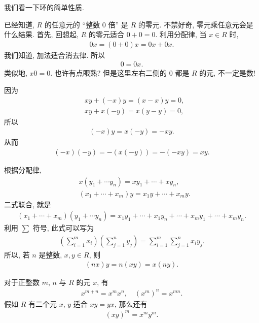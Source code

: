\begin{remark}
    我们看一下环的简单性质.

    已经知道, $R$ 的任意元的 ``整数 $0$ 倍'' 是 $R$ 的零元. 不禁好奇, 零元乘任意元会是什么结果. 首先, 回想起, $R$ 的零元适合 $0+0=0$. 利用分配律, 当 $x \in R$ 时,
    \begin{align*}
        0x = (0+0)x = 0x + 0x.
    \end{align*}
    我们知道, 加法适合消去律. 所以
    \begin{align*}
        0 = 0x.
    \end{align*}
    类似地, $x0 = 0$. 也许有点眼熟? 但是这里左右二侧的 $0$ 都是 $R$ 的元, 不一定是数!

    因为
    \begin{align*}
         & xy + (-x)y = (x-x)y = 0, \\
         & xy + x(-y) = x(y-y) = 0,
    \end{align*}
    所以
    \begin{align*}
        (-x)y = x(-y) = -xy.
    \end{align*}
    从而
    \begin{align*}
        (-x)(-y) = -(x(-y)) = -(-xy) = xy.
    \end{align*}

    根据分配律,
    \begin{align*}
         & x (y_1 + \cdots y_n) = x y_1 + \cdots + x y_n,   \\
         & (x_1 + \cdots + x_m) y = x_1 y + \cdots + x_m y.
    \end{align*}
    二式联合, 就是
    \begin{align*}
        (x_1 + \cdots + x_m)(y_1 + \cdots y_n) = x_1 y_1 + \cdots + x_1 y_n + \cdots + x_m y_1 + \cdots + x_m y_n.
    \end{align*}
    利用 $\sum$ 符号, 此式可以写为
    \begin{align*}
        \left( \sum_{i=1}^{m} x_i \right) \left( \sum_{j=1}^{n} y_j \right) = \sum_{i=1}^{m} \sum_{j=1}^{n} x_i y_j.
    \end{align*}
    所以, 若 $n$ 是整数, $x,y \in R$, 则
    \begin{align*}
        (nx)y = n(xy) = x(ny).
    \end{align*}

    对于正整数 $m$, $n$ 与 $R$ 的元 $x$, 有
    \begin{align*}
        x^{m+n} = x^m x^n, \quad (x^m)^n = x^{mn}.
    \end{align*}
    假如 $R$ 有二个元 $x$, $y$ 适合 $xy = yx$, 那么还有
    \begin{align*}
        (xy)^m = x^m y^m.
    \end{align*}
\end{remark}

